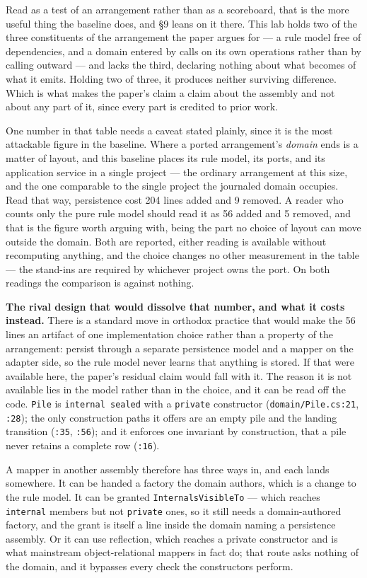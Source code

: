 \documentclass[
]{article}
\begin{document}
Read as a test of an arrangement rather than as a scoreboard, that is
the more useful thing the baseline does, and §9 leans on it there. This
lab holds two of the three constituents of the arrangement the paper
argues for --- a rule model free of dependencies, and a domain entered
by calls on its own operations rather than by calling outward --- and
lacks the third, declaring nothing about what becomes of what it emits.
Holding two of three, it produces neither surviving difference. Which is
what makes the paper's claim a claim about the assembly and not about
any part of it, since every part is credited to prior work.

One number in that table needs a caveat stated plainly, since it is the
most attackable figure in the baseline. Where a ported arrangement's
\emph{domain} ends is a matter of layout, and this baseline places its
rule model, its ports, and its application service in a single project
--- the ordinary arrangement at this size, and the one comparable to the
single project the journaled domain occupies. Read that way, persistence
cost 204 lines added and 9 removed. A reader who counts only the pure
rule model should read it as 56 added and 5 removed, and that is the
figure worth arguing with, being the part no choice of layout can move
outside the domain. Both are reported, either reading is available
without recomputing anything, and the choice changes no other
measurement in the table --- the stand-ins are required by whichever
project owns the port. On both readings the comparison is against
nothing.

\textbf{The rival design that would dissolve that number, and what it
costs instead.} There is a standard move in orthodox practice that would
make the 56 lines an artifact of one implementation choice rather than a
property of the arrangement: persist through a separate persistence
model and a mapper on the adapter side, so the rule model never learns
that anything is stored. If that were available here, the paper's
residual claim would fall with it. The reason it is not available lies
in the model rather than in the choice, and it can be read off the code.
\texttt{Pile} is \texttt{internal\ sealed} with a \texttt{private}
constructor (\texttt{domain/Pile.cs:21}, \texttt{:28}); the only
construction paths it offers are an empty pile and the landing
transition (\texttt{:35}, \texttt{:56}); and it enforces one invariant
by construction, that a pile never retains a complete row
(\texttt{:16}).

A mapper in another assembly therefore has three ways in, and each lands
somewhere. It can be handed a factory the domain authors, which is a
change to the rule model. It can be granted \texttt{InternalsVisibleTo}
--- which reaches \texttt{internal} members but not \texttt{private}
ones, so it still needs a domain-authored factory, and the grant is
itself a line inside the domain naming a persistence assembly. Or it can
use reflection, which reaches a private constructor and is what
mainstream object-relational mappers in fact do; that route asks nothing
of the domain, and it bypasses every check the constructors perform.
\end{document}
